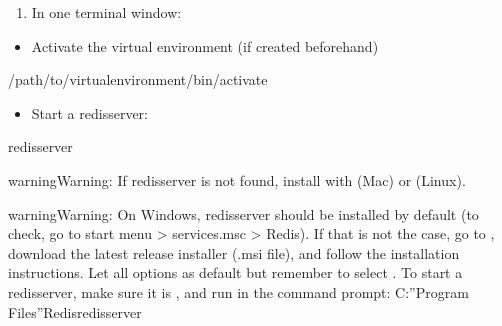 \documentclass[letterpaper,10pt,english]{sphinxmanual}
\begin{document}
\begin{enumerate}
%
\item {} 
In one terminal window:

\end{enumerate}
\begin{itemize}
\item {} 
Activate the virtual environment (if created beforehand)

\end{itemize}

\begin{sphinxVerbatim}[commandchars=\\\{\}]
\PYGZdl{}  /path/to/virtualenvironment/bin/activate
\end{sphinxVerbatim}
\begin{itemize}
\item {} 
Start a redis\sphinxhyphen{}server:

\end{itemize}

\begin{sphinxVerbatim}[commandchars=\\\{\}]
\PYGZdl{} redis\PYGZhy{}server
\end{sphinxVerbatim}

\begin{sphinxadmonition}{warning}{Warning:}
If redis\sphinxhyphen{}server is not found, install with  (Mac) or  (Linux).
\end{sphinxadmonition}

\begin{sphinxadmonition}{warning}{Warning:}
On Windows, redis\sphinxhyphen{}server should be installed by default (to check, go to start menu \textgreater{} services.msc \textgreater{} Redis). If that is not the case, go to , download the latest release installer (.msi file), and follow the installation instructions. Let all options as default but remember to select . To start a redis\sphinxhyphen{}server, make sure it is , and run in the command prompt: C:”Program Files”Redisredis\sphinxhyphen{}server
\end{sphinxadmonition}
\end{document}
